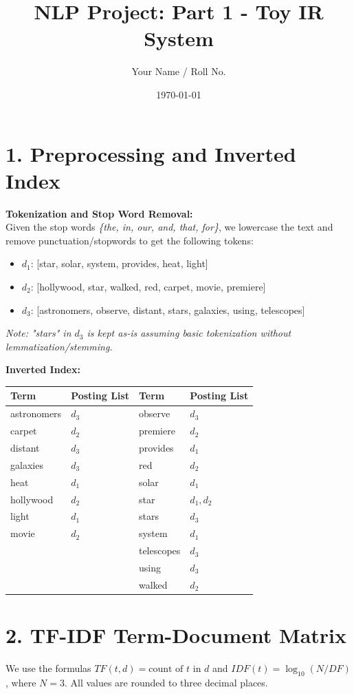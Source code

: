 \documentclass{article}
\title{NLP Project: Part 1 - Toy IR System}
\author{Your Name / Roll No.}
\date{\today}
\begin{document}
\maketitle

\section*{1. Preprocessing and Inverted Index}

\textbf{Tokenization and Stop Word Removal:} \\
Given the stop words \textit{\{the, in, our, and, that, for\}}, we lowercase the text and remove punctuation/stopwords to get the following tokens:
\begin{itemize}
    \item $d_1$: [star, solar, system, provides, heat, light]
    \item $d_2$: [hollywood, star, walked, red, carpet, movie, premiere]
    \item $d_3$: [astronomers, observe, distant, stars, galaxies, using, telescopes]
\end{itemize}
\textit{Note: "stars" in $d_3$ is kept as-is assuming basic tokenization without lemmatization/stemming.}

\vspace{1em}
\textbf{Inverted Index:}
\begin{center}
\begin{tabular}{ll | ll}
\toprule
\textbf{Term} & \textbf{Posting List} & \textbf{Term} & \textbf{Posting List} \\
\midrule
astronomers & $d_3$ & observe & $d_3$ \\
carpet & $d_2$ & premiere & $d_2$ \\
distant & $d_3$ & provides & $d_1$ \\
galaxies & $d_3$ & red & $d_2$ \\
heat & $d_1$ & solar & $d_1$ \\
hollywood & $d_2$ & star & $d_1, d_2$ \\
light & $d_1$ & stars & $d_3$ \\
movie & $d_2$ & system & $d_1$ \\
& & telescopes & $d_3$ \\
& & using & $d_3$ \\
& & walked & $d_2$ \\
\bottomrule
\end{tabular}
\end{center}

\section*{2. TF-IDF Term-Document Matrix}
We use the formulas $TF(t,d) = \text{count of } t \text{ in } d$ and $IDF(t) = \log_{10}(N / DF)$, where $N=3$. All values are rounded to three decimal places. 
\end{document}
